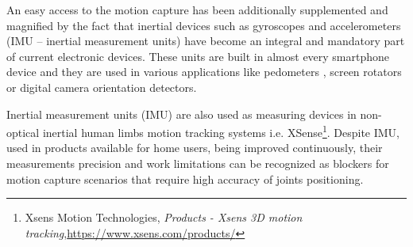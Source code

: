 \documentclass[sensors,article,submit,moreauthors,pdftex,10pt,a4paper]{mdpi}
\begin{document}
An easy access to the motion capture has been additionally supplemented and magnified by the fact that inertial devices such as gyroscopes and accelerometers (IMU – inertial measurement units) have become an integral and mandatory part of current electronic devices. These units are built in almost every smartphone device and they are used in various applications like pedometers \cite{Huang2012, Jayalath2013}, screen rotators \cite{Pedley2013} or digital camera orientation detectors.

Inertial measurement units (IMU) are also used as measuring devices in non-optical inertial human limbs motion tracking systems i.e. XSense\footnote{Xsens Motion Technologies, \textit{Products - Xsens 3D motion tracking},\url{https://www.xsens.com/products/}}. Despite IMU, used in products available for home users, being improved continuously, their measurements precision and work limitations can be recognized as blockers for motion capture scenarios that require high accuracy of joints positioning.\\%
\end{document}
